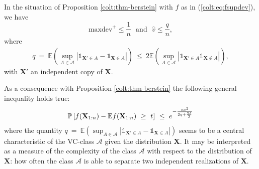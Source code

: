 \begin{lemma}
\label{colt:lem-1}
In the situation of Proposition \ref{colt:thm-berstein} with $f$ as in
(\ref{colt:eq:fsupdev}),  we have
$$\text{maxdev}^+ \le \frac{1}{n} \text{~~and~~} \hat v \le \frac{q}{n}, $$ where 
\begin{align}
\label{colt:lem-1:q}
q ~=~ \mathbb{E}\left ( \sup_{A \in \mathcal{A}} \left |
    \mathds{1}_{\mathbf{X}' \in A} - \mathds{1}_{\mathbf{X} \in A}
  \right|\right) ~\le~ 2 \mathbb{E}\left ( \sup_{A \in \mathcal{A}}
  \left | \mathds{1}_{\mathbf{X}' \in A}  \mathds{1}_{\mathbf{X}
      \notin A} \right|\right), 
\end{align}
with $\mathbf{X}'$ an independent copy of $\mathbf{X}$.

\end{lemma}


\noindent
As a consequence with Proposition \ref{colt:thm-berstein} the following general inequality holds true:
\begin{align}
\label{colt:concentration-general}
\mathbb{P}\left [ f(\mathbf X_{1:n}) - \mathbb{E} f(\mathbf X_{1:n}) ~\ge~ t \right] ~\le~ e^{-\frac{n t^2}{2q + \frac{2t}{3}} }
\end{align}
\noindent
where the quantity $q~=~ \mathbb{E}\left ( \sup_{A \in \mathcal{A}} \left | \mathds{1}_{\mathbf{X}' \in A} - \mathds{1}_{\mathbf{X} \in A} \right|\right)$ %
seems to be a central characteristic of the VC-class $\mathcal{A}$ given the distribution $\mathbf{X}$. It may be interpreted as a measure of the complexity of the class $\mathcal{A}$ with respect to the distribution of $\mathbf{X}$: how often the class $\mathcal{A}$ is able to separate two independent realizations of $\mathbf{X}$. 

